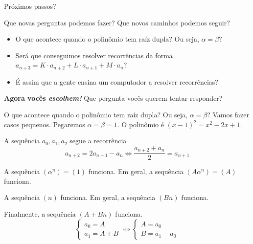 \documentclass[aspectratio=169, handout]{beamer}
\begin{document}
\begin{frame}{Próximos passos?}

	Que novas perguntas podemos fazer? Que novos caminhos podemos seguir?\pause

	\vspace{1em}

	\begin{itemize}
		\item O que acontece quando o polinômio tem raíz dupla? Ou seja, $\alpha = \beta$? \pause
		\item Será que conseguimos resolver recorrências da forma $a_{n+3} = K \cdot a_{n+2} + L \cdot a_{n+1} + M \cdot a_n$? \pause
		\item É assim que a gente ensina um computador a resolver recorrências?
	\end{itemize}

	\vspace{1em}

	\pause \textbf{Agora vocês \emph{escolhem!}} Que pergunta vocês querem tentar responder?


\end{frame}

\begin{frame}{O que acontece quando o polinômio tem raíz dupla? Ou seja, $\alpha = \beta$?}
	Vamos fazer casos pequenos. Pegaremos $\alpha = \beta = 1$. O polinômio é $(x-1)^2 = x^2 - 2x + 1$.

	A sequência $a_0, a_1, a_2$ segue a recorrência \[
		a_{n+2} = 2a_{n+1} - a_n \iff \frac{a_{n+2} + a_{n}}{2} = a_{n+1}
	\]

	A sequência $(\alpha^n) = (1)$ funciona. Em geral, a sequência $(A\alpha^n) = (A)$ funciona.
	
	A sequência $(n)$ funciona. Em geral, a sequência  $(Bn)$ funciona.

	Finalmente, a sequência  $(A + Bn)$ funciona. \[
		\begin{cases}
			a_0 = A\\
			a_1 = A + B
		\end{cases}
		\iff 
		\begin{cases}
			A = a_0\\
			B = a_1 - a_0
		\end{cases}
	\]

\end{frame}
\end{document}
